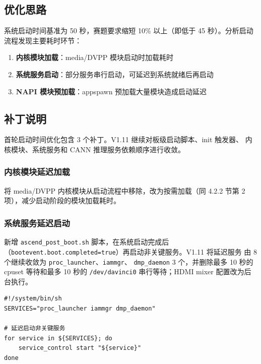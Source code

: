 \subsection{优化思路}

系统启动时间基准为 50 秒，赛题要求缩短 10\% 以上（即低于 45 秒）。分析启动流程发现主要耗时环节：

\begin{enumerate}
  \item \textbf{内核模块加载}：media/DVPP 模块启动时加载耗时
  \item \textbf{系统服务启动}：部分服务串行启动，可延迟到系统就绪后再启动
  \item \textbf{NAPI 模块预加载}：appspawn 预加载大量模块造成启动延迟
\end{enumerate}

\subsection{补丁说明}

首轮启动时间优化包含 3 个补丁。V1.11 继续对板级启动脚本、init 触发器、
内核模块、系统服务和 CANN 推理服务依赖顺序进行收敛。

\subsubsection{内核模块延迟加载}

将 media/DVPP 内核模块从启动流程中移除，改为按需加载（同 4.2.2 节第 2 项），减少启动阶段的模块加载耗时。

\subsubsection{系统服务延迟启动}

新增 \texttt{ascend\_post\_boot.sh} 脚本，在系统启动完成后
（\texttt{bootevent.boot.completed=true}）再启动非关键服务。V1.11 将延迟服务
由 8 个继续收敛为 \texttt{proc\_launcher}、\texttt{iammgr}、
\texttt{dmp\_daemon} 3 个，并删除最多 10 秒的 cpuset 等待和最多 10 秒的
\texttt{/dev/davinci0} 串行等待；HDMI mixer 配置改为后台执行。

\begin{lstlisting}[style=shell, caption={ascend\_post\_boot.sh 延迟启动服务}]
#!/system/bin/sh
SERVICES="proc_launcher iammgr dmp_daemon"

# 延迟启动非关键服务
for service in ${SERVICES}; do
    service_control start "${service}"
done
\end{lstlisting}

